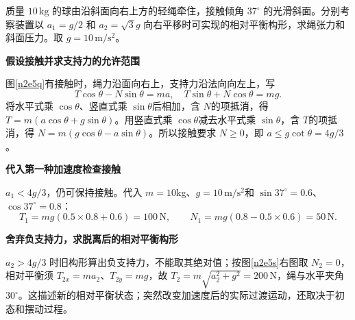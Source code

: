 \begin{question}\begin{example}[加速斜面上的悬球脱离]\label{n2e5}
质量 $10\,\mathrm{kg}$ 的球由沿斜面向右上方的轻绳牵住，接触倾角 $37^\circ$ 的光滑斜面。分别考察装置以 $a_1=g/2$ 和 $a_2=\sqrt3g$ 向右平移时可实现的相对平衡构形，求绳张力和斜面压力。取 $g=10\,\mathrm{m/s^2}$。
\end{example}\end{question}
\begin{solution}\textbf{假设接触并求支持力的允许范围}\par\nobreak
图\ref{n2e5q}有接触时，绳力沿面向右上，支持力沿法向向左上，写
\[
 T\cos\theta-N\sin\theta=ma,\quad T\sin\theta+N\cos\theta=mg.
\]
将水平式乘 $\cos\theta$、竖直式乘 $\sin\theta$后相加，含 $N$的项抵消，得 $T=m(a\cos\theta+g\sin\theta)$。用竖直式乘 $\cos\theta$减去水平式乘 $\sin\theta$，含 $T$的项抵消，得 $N=m(g\cos\theta-a\sin\theta)$。所以接触要求 $N\ge0$，即 $a\le g\cot\theta=4g/3$。


\par\medskip{}\noindent\textbf{代入第一种加速度检查接触}\par\nobreak
$a_1<4g/3$，仍可保持接触。代入 $m=10$kg、$g=10\,\mathrm{m/s^2}$和 $\sin37^\circ=0.6$、$\cos37^\circ=0.8$：
\[
 T_1=mg(0.5\times0.8+0.6)=100\,\mathrm N,
 \qquad N_1=mg(0.8-0.5\times0.6)=50\,\mathrm N.
\]

\par\medskip{}\noindent\textbf{舍弃负支持力，求脱离后的相对平衡构形}\par\nobreak
$a_2>4g/3$ 时旧构形算出负支持力，不能取其绝对值；按图\ref{n2e5s}右图取 $N_2=0$，相对平衡须 $T_{2x}=ma_2$、$T_{2y}=mg$，故 $T_2=m\sqrt{a_2^2+g^2}=200\,\mathrm N$，绳与水平夹角 $30^\circ$。这描述新的相对平衡状态；突然改变加速度后的实际过渡运动，还取决于初态和摆动过程。
\end{solution}

